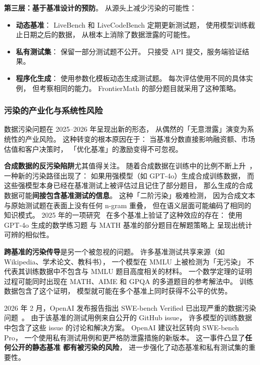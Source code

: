 \textbf{第三层：基于基准设计的预防}。
从源头上减少污染的可能性：
\begin{itemize}[noitemsep]
  \item \textbf{动态基准}：
        LiveBench 和 LiveCodeBench 定期更新测试题，
        使用模型训练截止日期之后的数据，
        从根本上消除了数据泄露的可能性。
  \item \textbf{私有测试集}：
        保留一部分测试题不公开。
        只接受 API 提交，服务端验证结果。
  \item \textbf{程序化生成}：
        使用参数化模板动态生成测试题。
        每次评估使用不同的具体实例，
        但考察相同的能力。
        FrontierMath 的部分题目就采用了这种策略。
\end{itemize}

\subsubsection{污染的产业化与系统性风险}

数据污染问题在 2025--2026 年呈现出新的形态，
从偶然的「无意泄露」演变为系统性的产业风险。
这种转变的根本原因在于：
当基准分数直接影响融资额、市场估值和客户决策时，
「优化基准」的激励变得不可忽视。

\textbf{合成数据的反污染陷阱}尤其值得关注。
随着合成数据在训练中的比例不断上升~\cite{liu2024synthetic}，
一种新的污染路径出现了：
如果用强模型（如 GPT-4o）生成合成训练数据，
而这些强模型本身已经在基准测试上被评估过且记住了部分题目，
那么生成的合成数据可能\textbf{间接包含基准测试的信息}。
这种「二阶污染」极难检测，
因为合成文本与原始测试题在表面上没有任何 n-gram 重叠，
但在语义层面可能编码了相同的知识模式。
2025 年的一项研究~\cite{mehta2025contamination}
在多个基准上验证了这种效应的存在：
使用 GPT-4o 生成的数学练习题
与 MATH 基准的部分题目在解题策略上
呈现出统计可辨的相似性。

\textbf{跨基准的污染传导}是另一个被忽视的问题。
许多基准测试共享来源（如 Wikipedia、学术论文、教科书），
一个模型在 MMLU 上被检测为「无污染」
不代表其训练数据中不包含与 MMLU 题目高度相关的材料。
一个数学定理的证明过程可能同时出现在
MATH、AIME 和 GPQA 的多道题目的参考解法中。
训练数据包含了这个证明，
模型就可能在多个基准上同时获得不公平的优势。

\begin{warnbox}
2026 年 2 月，OpenAI 发布报告指出
SWE-bench Verified 已出现严重的数据污染问题~\cite{openai2026swebenchpro}。
由于该基准的测试用例来自公开的 GitHub issue，
许多模型的训练数据中包含了这些 issue 的讨论和解决方案。
OpenAI 建议社区转向 SWE-bench Pro，
一个使用私有测试用例和更严格防泄露措施的新版本。
这一事件凸显了\textbf{任何公开的静态基准
都有被污染的风险}，
进一步强化了动态基准和私有测试集的重要性。
\end{warnbox}

